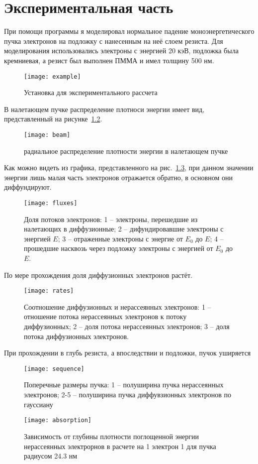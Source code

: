 \chapter{Экспериментальная часть}
При помощи программы я моделировал нормальное падение моноэнергетического пучка электронов на подложку с нанесенным на неё слоем резиста. Для моделирования использовались электроны с энергией 20 кэВ, подложка была кремниевая, а резист был выполнен ПММА и имел толщину 500 нм.

\begin{figure}[h]
    \center
    \texttt{[image: example]}
    \caption{Установка для экспериментального рассчета}
    \label{fig:example}
\end{figure}

В налетающем пучке распределение плотноси энергии имеет вид, представленный на рисунке~\ref{fig:beam}.
\begin{figure}[h]
    \center
    \texttt{[image: beam]}
    \caption{радиальное распределение плотности энергии в налетающем пучке}
    \label{fig:beam}
\end{figure}

Как можно видеть из графика, представленного на рис.~\ref{fig:fluxes}, при данном значении энергии лишь малая часть электронов отражается обратно, в основном они диффундируют.
\begin{figure}[h]
    \center
    \texttt{[image: fluxes]}
    \caption{Доля потоков электронов:
    1 -- электроны, перешедшие из налетающих в диффузионные;
2 -- дифундировавшие электроны с энергией $E$;
3 -- отраженные электроны с энергие от $E_0$ до $E$;
4 -- прошедшие насквозь через подложку электроны с энергией от $E_0$ до $E$.
}
    \label{fig:fluxes}
\end{figure}


По мере прохождения доля диффузионных электронов растёт.

\begin{figure}[h]
    \center
    \texttt{[image: rates]}
    \caption{Соотношение диффузионных и нерассеянных электронов: 1 -- отношение потока нерассеянных электронов к потоку диффузионных;
2 -- доля потока нерассеянных электронов;
3 -- доля потока диффузионных электронов.
}
    \label{fig:rates}
\end{figure}

При прохождении в глубь резиста, а впоследствии и подложки, пучок уширяется
\begin{figure}[h]
    \center
    \texttt{[image: sequence]}
    \caption{Поперечные размеры пучка:
1 -- полуширина пучка нерассеянных электронов;
2-5 -- полуширина пучка диффувзионных электронов по гауссиану}
    \label{fig:sequence}
\end{figure}


\begin{figure}[h]
    \center
    \texttt{[image: absorption]}
    \caption{Зависимость от глубины плотности поглощенной энергии нерассеянных электрорнов в расчете на 1 электрон 1 для пучка радиусом 24.3 нм}
    \label{fig:absorption}
\end{figure}
